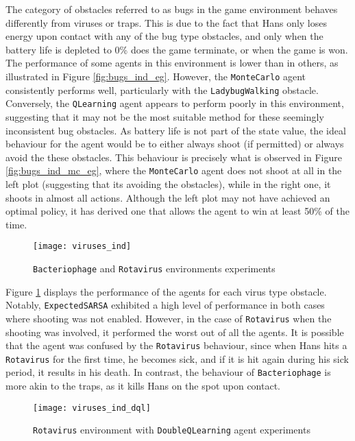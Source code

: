 The category of obstacles referred to as bugs in the game environment behaves differently from viruses or traps. This is due to the fact that Hans only loses energy upon contact with any of the bug type obstacles, and only when the battery life is depleted to 0\% does the game terminate, or when the game is won. The performance of some agents in this environment is lower than in others, as illustrated in Figure \ref{fig:bugs_ind_eg}. However, the \texttt{MonteCarlo} agent consistently performs well, particularly with the \texttt{LadybugWalking} obstacle. Conversely, the \texttt{QLearning} agent appears to perform poorly in this environment, suggesting that it may not be the most suitable method for these seemingly inconsistent bug obstacles. As battery life is not part of the state value, the ideal behaviour for the agent would be to either always shoot (if permitted) or always avoid the these obstacles. This behaviour is precisely what is observed in Figure \ref{fig:bugs_ind_mc_eg}, where the \texttt{MonteCarlo} agent does not shoot at all in the left plot (suggesting that its avoiding the obstacles), while in the right one, it shoots in almost all actions. Although the left plot may not have achieved an optimal policy, it has derived one that allows the agent to win at least 50\% of the time.

\begin{figure}[h]
    \centering
    \texttt{[image: viruses\_ind]}
    \caption{\texttt{Bacteriophage} and \texttt{Rotavirus} environments experiments}
    \label{fig:viruses_ind_eg}
\end{figure}

Figure \ref{fig:viruses_ind_eg} displays the performance of the agents for each virus type obstacle. Notably, \texttt{ExpectedSARSA} exhibited a high level of performance in both cases where shooting was not enabled. However, in the case of \texttt{Rotavirus} when the shooting was involved, it performed the worst out of all the agents. It is possible that the agent was confused by the \texttt{Rotavirus} behaviour, since when Hans hits a \texttt{Rotavirus} for the first time, he becomes sick, and if it is hit again during his sick period, it results in his death. In contrast, the behaviour of \texttt{Bacteriophage} is more akin to the traps, as it kills Hans on the spot upon contact.

\begin{figure}[h]
    \centering
    \texttt{[image: viruses\_ind\_dql]}
    \caption{\texttt{Rotavirus} environment with \texttt{DoubleQLearning} agent experiments}
    \label{fig:viruses_ind_dql_eg}
\end{figure}

